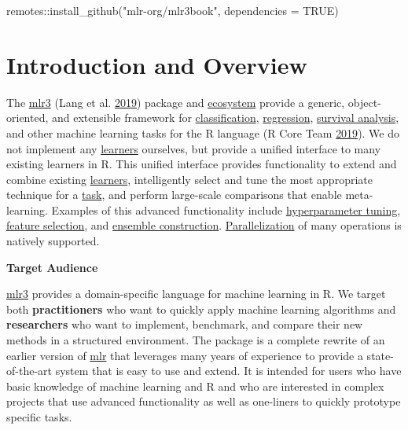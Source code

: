 \documentclass[]{article}
\newenvironment{Shaded}{}{}
\newcommand{\DataTypeTok}[1]{#1}
\newcommand{\KeywordTok}[1]{\textcolor[rgb]{0.00,0.00,1.00}{#1}}
\newcommand{\NormalTok}[1]{#1}
\newcommand{\OperatorTok}[1]{#1}
\newcommand{\OtherTok}[1]{\textcolor[rgb]{1.00,0.25,0.00}{#1}}
\newcommand{\StringTok}[1]{\textcolor[rgb]{0.00,0.50,0.50}{#1}}
\renewenvironment{Shaded} {\begin{snugshade}\small} {\end{snugshade}}
\begin{document}
\begin{Shaded}
\begin{Highlighting}[]
\NormalTok{remotes}\OperatorTok{::}\KeywordTok{install_github}\NormalTok{(}\StringTok{"mlr-org/mlr3book"}\NormalTok{, }\DataTypeTok{dependencies =} \OtherTok{TRUE}\NormalTok{)}
\end{Highlighting}
\end{Shaded}

\hypertarget{introduction-and-overview}{%
\section{Introduction and Overview}\label{introduction-and-overview}}

The \href{https://mlr3.mlr-org.com}{mlr3} (Lang et al. \protect\hyperlink{ref-mlr3}{2019}) package and \href{https://github.com/mlr-org/mlr3/wiki/Extension-Packages}{ecosystem} provide a generic, object-oriented, and extensible framework for \protect\hyperlink{tasks}{classification}, \protect\hyperlink{tasks}{regression}, \protect\hyperlink{survival}{survival analysis}, and other machine learning tasks for the R language (R Core Team \protect\hyperlink{ref-R}{2019}).
We do not implement any \protect\hyperlink{learners}{learners} ourselves, but provide a unified interface to many existing learners in R.
This unified interface provides functionality to extend and combine existing \protect\hyperlink{learners}{learners}, intelligently select and tune the most appropriate technique for a \protect\hyperlink{tasks}{task}, and perform large-scale comparisons that enable meta-learning.
Examples of this advanced functionality include \protect\hyperlink{tuning}{hyperparameter tuning}, \protect\hyperlink{fs}{feature selection}, and \protect\hyperlink{fs-ensemble}{ensemble construction}. \protect\hyperlink{parallelization}{Parallelization} of many operations is natively supported.

\textbf{Target Audience}

\href{https://mlr3.mlr-org.com}{mlr3} provides a domain-specific language for machine learning in R.
We target both \textbf{practitioners} who want to quickly apply machine learning algorithms and \textbf{researchers} who want to implement, benchmark, and compare their new methods in a structured environment.
The package is a complete rewrite of an earlier version of \href{https://mlr.mlr-org.com}{mlr} that leverages many years of experience to provide a state-of-the-art system that is easy to use and extend.
It is intended for users who have basic knowledge of machine learning and R and who are interested in complex projects that use advanced functionality as well as one-liners to quickly prototype specific tasks.
\end{document}
